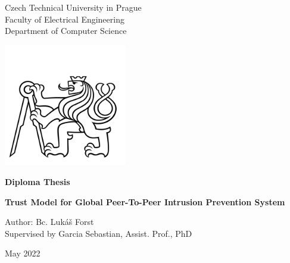 

\begin{titlepage}
    \begin{center}
        
        \LARGE
        Czech Technical University in Prague\\
        Faculty of Electrical Engineering\\
        Department of Computer Science
        
        \includegraphics[width=0.4\textwidth]{assets/ctu_blackwhite.jpg}

        \Large
        \textbf{Diploma Thesis}
        
        \vfill
        
        \vspace*{0.5cm}
        \LARGE
        \textbf{Trust Model for Global Peer-To-Peer Intrusion Prevention System} 
        
        \vfill

        \large
        Author: Bc. Lukáš Forst \\
        Supervised by Garcia Sebastian, Assist. Prof., PhD
        
        \vspace{0.8cm}

        \Large
        May 2022

    \end{center}
\end{titlepage}

\thispagestyle{empty}
\cleardoublepage